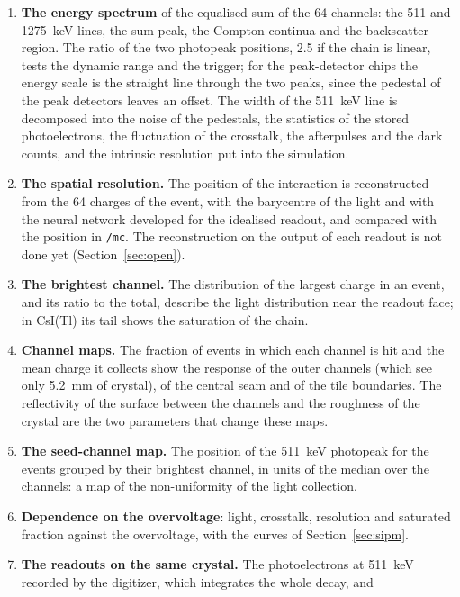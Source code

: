 \documentclass[11pt]{article}
\newcommand{\code}[1]{\texttt{#1}}
\newcommand{\csitl}{CsI(Tl)\xspace}
\begin{document}
\begin{enumerate}
  photoelectrons in \code{/mc}. The ratio of the photoelectrons between the
  BGO configurations at room temperature and at 250~K gives the change of
  the light yield with the temperature.
\item {\bf The energy spectrum} of the equalised sum of the 64 channels: the
  511 and 1275~keV lines, the sum peak, the Compton continua and the
  backscatter region. The ratio of the two photopeak positions, 2.5 if the
  chain is linear, tests the dynamic range and the trigger; for the
  peak-detector chips the energy scale is the straight line through the two
  peaks, since the pedestal of the peak detectors leaves an offset. The
  width of the 511~keV line is decomposed into the noise of the pedestals,
  the statistics of the stored photoelectrons, the fluctuation of the
  crosstalk, the afterpulses and the dark counts, and the intrinsic
  resolution put into the simulation.
\item {\bf The spatial resolution.} The position of the interaction is
  reconstructed from the 64 charges of the event, with the barycentre of
  the light and with the neural network developed for the idealised readout,
  and compared with the position in \code{/mc}. The reconstruction on the
  output of each readout is not done yet (Section~\ref{sec:open}).
\item {\bf The brightest channel.} The distribution of the largest charge in
  an event, and its ratio to the total, describe the light distribution near
  the readout face; in \csitl its tail shows the saturation of the chain.
\item {\bf Channel maps.} The fraction of events in which each channel is hit
  and the mean charge it collects show the response of the outer channels
  (which see only 5.2~mm of crystal), of the central seam and of the tile
  boundaries. The reflectivity of the surface between the channels and the
  roughness of the crystal are the two parameters that change these maps.
\item {\bf The seed-channel map.} The position of the 511~keV photopeak for
  the events grouped by their brightest channel, in units of the median over
  the channels: a map of the non-uniformity of the light collection.
\item {\bf Dependence on the overvoltage}: light, crosstalk, resolution and
  saturated fraction against the overvoltage, with the curves of
  Section~\ref{sec:sipm}.
\item {\bf The readouts on the same crystal.} The photoelectrons at
  511~keV recorded by the digitizer, which integrates the whole decay, and

\end{enumerate}
\end{document}
